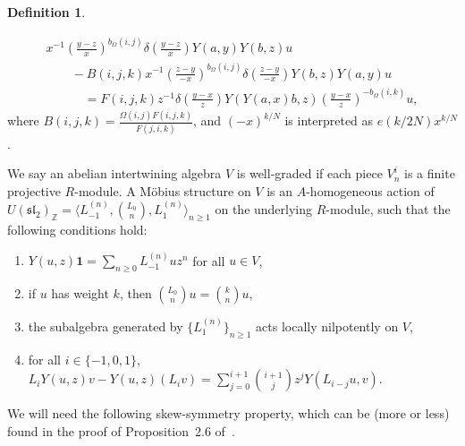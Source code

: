 \documentclass[pdftex]{sigma}
\newcommand{\bZ}{\mathbb{Z}}
\newcommand{\unit}{\mathbf{1}}
\newcommand{\fsl}{\mathfrak{sl}}
\theoremstyle{definition}
\newtheorem{defn}[thm]{Definition}
\begin{document}
\begin{defn}
\begin{enumerate}
 \begin{gather*}
 x^{-1} \left(\frac{y-z}{x} \right)^{b_\Omega(i,j)} \delta\left(\frac{y-z}{x}\right) Y(a,y) Y(b,z) u \\
\qquad{}- B(i,j,k) x^{-1} \left(\frac{z-y}{-x} \right)^{b_\Omega(i,j)} \delta\left(\frac{z-y}{-x}\right) Y(b,z) Y(a,y) u \\
 \qquad\quad{} = F(i,j,k) z^{-1} \delta\left(\frac{y-x}{z}\right) Y(Y(a,x)b,z) \left(\frac{y-x}{z} \right)^{-b_\Omega(i,k)} u,
\end{gather*}
where $B(i,j,k) = \frac{\Omega(i,j)F(i,j,k)}{F(j,i,k)}$, and $(-x)^{k/N}$ is interpreted as $e(k/2N)x^{k/N}$.
\end{enumerate}
We say an abelian intertwining algebra $V$ is well-graded if each piece $V_n^i$ is a finite projective $R$-module. A M\"obius structure on $V$ is an $A$-homogeneous action of $U(\fsl_2)_{\bZ} = \big\langle L_{-1}^{(n)}, \binom{L_0}{n}, L_1^{(n)} \big\rangle_{n \geq 1}$ on the underlying $R$-module, such that the following conditions hold:
\begin{enumerate}\itemsep=0pt
\item[1)] $Y(u,z)\unit = \sum\limits_{n \geq 0} L_{-1}^{(n)}u z^n$ for all $u \in V$,
\item[2)] if $u$ has weight $k$, then $\binom{L_0}{n}u = \binom{k}{n}u$,
\item[3)] the subalgebra generated by $\{ L_1^{(n)} \}_{n \geq 1}$ acts locally nilpotently on $V$,
\item[4)] for all $i \in \{-1,0,1\}$, $L_i Y(u,z)v - Y(u,z)(L_i v) = \sum\limits_{j =0}^{i+1} \binom{i+1}{j} z^j Y(L_{i-j} u,v)$.
\end{enumerate}
\end{defn}

We will need the following skew-symmetry property, which can be (more or less) found in the proof of Proposition~2.6 of~\cite{GL00}.
\end{document}
